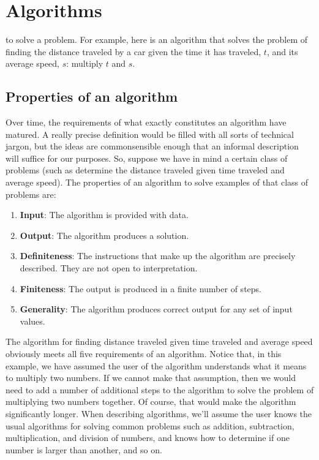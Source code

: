 \chapter{Algorithms}


 to solve a problem. For example, here is an algorithm
that solves the problem of finding the distance traveled by a car given the time it has traveled,
$t$, and its average speed, $s$: \textsf{multiply $t$ and $s$}. 

\section{Properties of an algorithm}
Over time, the requirements of what exactly constitutes an algorithm have matured. A really
precise definition would be filled with all sorts of technical jargon, but the ideas are 
commonsensible
enough that an informal description will suffice for our purposes. So, suppose we have in mind a 
certain class of problems (such as determine the distance traveled given time traveled and 
average speed). The properties of an
algorithm to solve examples of that class of problems are:
\begin{enumerate}
 \item {\bfseries Input}: The algorithm is provided with data.
 
 \item {\bfseries Output}: The algorithm produces a solution.
 
 \item {\bfseries Definiteness}: The instructions that make up the algorithm are precisely
 described. They are not open to interpretation.
 
 \item {\bfseries Finiteness}: The output is produced in a finite number of steps.
 
 \item {\bfseries Generality}: The algorithm produces correct output for any set of
 input values.
\end{enumerate}

The algorithm for finding distance traveled given time traveled and average speed obviously 
meets all five requirements of an algorithm. Notice that, in this example, we have assumed 
the user of the algorithm understands what it means to multiply
two numbers. If we cannot make that assumption, then we would need to add a number of 
additional steps to the algorithm to solve the problem of multiplying two numbers together.
Of course, that would make the algorithm significantly longer. When describing algorithms,
we'll assume the user knows the usual algorithms for solving common problems such
as addition, subtraction, multiplication, and division  of numbers, and knows how to determine
if one number is larger than another, and so on.

